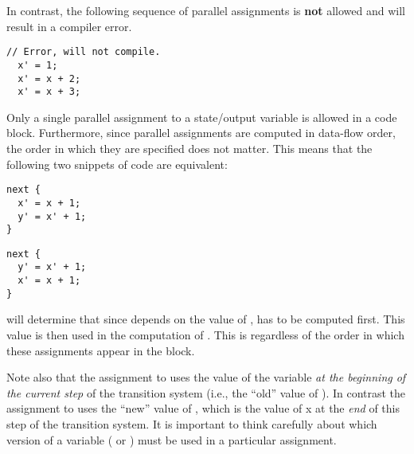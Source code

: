     In contrast, the following sequence of parallel assignments is \textbf{not} allowed and will result in a compiler error.
\begin{lstlisting}[language=uclid,style=uclidstyle]
  // Error, will not compile.
  x' = 1;
  x' = x + 2;
  x' = x + 3;
\end{lstlisting}
Only a single parallel assignment to a state/output variable is allowed in a code block. Furthermore, since parallel assignments are computed in data-flow order, the order in which they are specified does not matter. This means that the following two snippets of code are equivalent:

\begin{lstlisting}[language=uclid,style=uclidstyle]
next {
  x' = x + 1;
  y' = x' + 1;
}
\end{lstlisting}

\begin{lstlisting}[language=uclid,style=uclidstyle]
next {
  y' = x' + 1;
  x' = x + 1;
}
\end{lstlisting}

    \uclid{} will determine that since  depends on the value of ,  has to be computed first. This value is then used in the computation of . This is regardless of the order in which these assignments appear in the  block.

    Note also that the assignment to  uses the value of the variable  \emph{at the beginning of the current step} of the transition system (i.e., the ``old'' value of ). In contrast the assignment to  uses the ``new'' value of , which is the value of x at the \emph{end} of this step of the transition system. It is important to think carefully about which version of a variable ( or ) must be used in a particular assignment.

